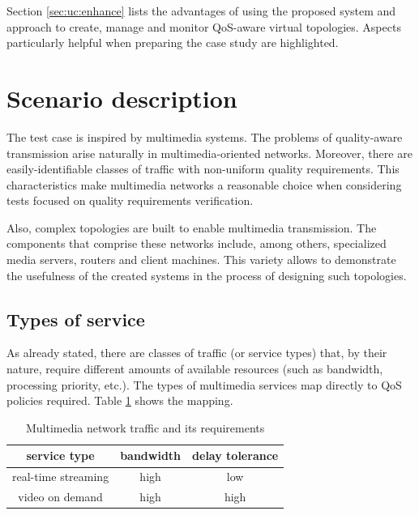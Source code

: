 \documentclass[11pt]{book}
\begin{document}
    Section \ref{sec:uc:enhance} lists the advantages of using the proposed system and approach to create, manage and
    monitor QoS-aware virtual topologies. Aspects particularly helpful when preparing the case study are highlighted.


    \section{Scenario description}
    \label{sec:uc:description}

      The test case is inspired by multimedia systems. The problems of quality-aware transmission arise naturally
      in multimedia-oriented networks. Moreover, there are easily-identifiable classes of traffic with non-uniform
      quality requirements. This characteristics make multimedia networks a reasonable choice when considering tests
      focused on quality requirements verification.
      
      Also, complex topologies are built to enable multimedia transmission. The components that comprise these networks
      include, among others, specialized media servers, routers and client machines. This variety allows to demonstrate
      the usefulness of the created systems in the process of designing such topologies.


      \subsection{Types of service}
      
        As already stated, there are classes of traffic (or service types) that, by their nature, require different
        amounts of available resources (such as bandwidth, processing priority, etc.). The types of multimedia services
        map directly to QoS policies required. Table \ref{tab:uc:qos} shows the mapping.

        \begin{table}[H]
          \begin{center}
            \begin{tabular}{|c|c|c|}
              \hline
              service type        & bandwidth & delay tolerance \\
              \hline \hline
              real-time streaming & high      & low \\
              \hline
              video on demand     & high      & high  \\
              \hline
            \end{tabular}
          \end{center}


          \caption{Multimedia network traffic and its requirements}
          \label{tab:uc:qos}
        \end{table}
\end{document}
